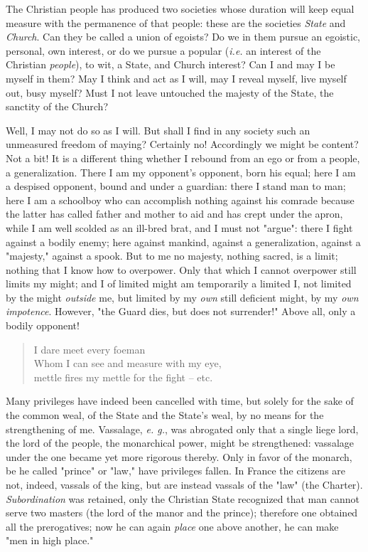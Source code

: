\documentclass[a4paper]{book}
\begin{document}
The Christian people has produced two societies whose duration will keep equal 
measure with the permanence of that people: these are the societies 
\textit{State} and \textit{Church}. Can they be called a union of egoists? Do 
we in them pursue an egoistic, personal, own interest, or do we pursue a 
popular (\textit{i.e.} an interest of the Christian \textit{people}), to wit, 
a State, and Church interest? Can I and may I be myself in them? May I think 
and act as I will, may I reveal myself, live myself out, busy myself? Must I 
not leave untouched the majesty of the State, the sanctity of the Church?

Well, I may not do so as I will. But shall I find in any society such an 
unmeasured freedom of maying? Certainly no! Accordingly we might be content? 
Not a bit! It is a different thing whether I rebound from an ego or from a 
people, a generalization. There I am my opponent's opponent, born his equal; 
here I am a despised opponent, bound and under a guardian: there I stand man 
to man; here I am a schoolboy who can accomplish nothing against his comrade 
because the latter has called father and mother to aid and has crept under the 
apron, while I am well scolded as an ill-bred brat, and I must not 
"{}argue"{}: there I fight against a bodily enemy; here against mankind, 
against a generalization, against a "{}majesty,"{} against a spook. But to me 
no majesty, nothing sacred, is a limit; nothing that I know how to overpower. 
Only that which I cannot overpower still limits my might; and I of limited 
might am temporarily a limited I, not limited by the might \textit{outside} 
me, but limited by my \textit{own} still deficient might, by my \textit{own 
impotence}. However, "{}the Guard dies, but does not surrender!"{} Above all, 
only a bodily opponent!

\begin{quotation}

\noindent{} I dare meet every foeman\\
 Whom I can see and measure with my eye,\\
 mettle fires my mettle for the fight -- etc. \end{quotation}

\noindent{}Many privileges have indeed been cancelled with time, but solely 
for the sake of the common weal, of the State and the State's weal, by no 
means for the strengthening of me. Vassalage, \textit{e. g.}, was abrogated 
only that a single liege lord, the lord of the people, the monarchical power, 
might be strengthened: vassalage under the one became yet more rigorous 
thereby. Only in favor of the monarch, be he called "{}prince"{} or "{}law,"{} 
have privileges fallen. In France the citizens are not, indeed, vassals of the 
king, but are instead vassals of the "{}law"{} (the Charter). 
\textit{Subordination} was retained, only the Christian State recognized that 
man cannot serve two masters (the lord of the manor and the prince); therefore 
one obtained all the prerogatives; now he can again \textit{place} one above 
another, he can make "{}men in high place."{}
\end{document}
